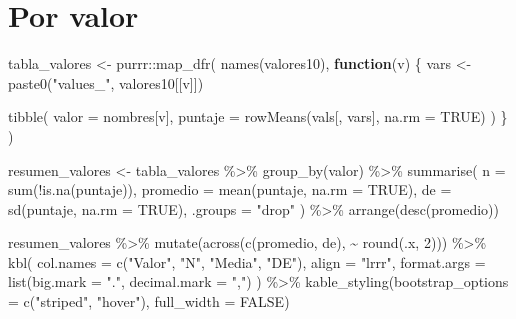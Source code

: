\documentclass[
  spanish,
  a4paper,
  oneside]{scrbook}
\newenvironment{Shaded}{\begin{snugshade}}{\end{snugshade}}
\newcommand{\AttributeTok}[1]{\textcolor[rgb]{0.40,0.45,0.13}{#1}}
\newcommand{\ConstantTok}[1]{\textcolor[rgb]{0.56,0.35,0.01}{#1}}
\newcommand{\ControlFlowTok}[1]{\textcolor[rgb]{0.00,0.23,0.31}{\textbf{#1}}}
\newcommand{\DecValTok}[1]{\textcolor[rgb]{0.68,0.00,0.00}{#1}}
\newcommand{\FunctionTok}[1]{\textcolor[rgb]{0.28,0.35,0.67}{#1}}
\newcommand{\NormalTok}[1]{\textcolor[rgb]{0.00,0.23,0.31}{#1}}
\newcommand{\OtherTok}[1]{\textcolor[rgb]{0.00,0.23,0.31}{#1}}
\newcommand{\SpecialCharTok}[1]{\textcolor[rgb]{0.37,0.37,0.37}{#1}}
\newcommand{\StringTok}[1]{\textcolor[rgb]{0.13,0.47,0.30}{#1}}
\begin{document}
\section{Por valor}\label{por-valor}

\begin{Shaded}
\begin{Highlighting}[]
\NormalTok{tabla\_valores }\OtherTok{\textless{}{-}}\NormalTok{ purrr}\SpecialCharTok{::}\FunctionTok{map\_dfr}\NormalTok{(}
  \FunctionTok{names}\NormalTok{(valores10),}
  \ControlFlowTok{function}\NormalTok{(v) \{}
\NormalTok{    vars }\OtherTok{\textless{}{-}} \FunctionTok{paste0}\NormalTok{(}\StringTok{"values\_"}\NormalTok{, valores10[[v]])}

    \FunctionTok{tibble}\NormalTok{(}
      \AttributeTok{valor =}\NormalTok{ nombres[v],}
      \AttributeTok{puntaje =} \FunctionTok{rowMeans}\NormalTok{(vals[, vars], }\AttributeTok{na.rm =} \ConstantTok{TRUE}\NormalTok{)}
\NormalTok{    )}
\NormalTok{  \}}
\NormalTok{)}

\NormalTok{resumen\_valores }\OtherTok{\textless{}{-}}\NormalTok{ tabla\_valores }\SpecialCharTok{\%\textgreater{}\%}
  \FunctionTok{group\_by}\NormalTok{(valor) }\SpecialCharTok{\%\textgreater{}\%}
  \FunctionTok{summarise}\NormalTok{(}
    \AttributeTok{n        =} \FunctionTok{sum}\NormalTok{(}\SpecialCharTok{!}\FunctionTok{is.na}\NormalTok{(puntaje)),}
    \AttributeTok{promedio =} \FunctionTok{mean}\NormalTok{(puntaje, }\AttributeTok{na.rm =} \ConstantTok{TRUE}\NormalTok{),}
    \AttributeTok{de       =} \FunctionTok{sd}\NormalTok{(puntaje, }\AttributeTok{na.rm =} \ConstantTok{TRUE}\NormalTok{),}
    \AttributeTok{.groups  =} \StringTok{"drop"}
\NormalTok{  ) }\SpecialCharTok{\%\textgreater{}\%}
  \FunctionTok{arrange}\NormalTok{(}\FunctionTok{desc}\NormalTok{(promedio))}

\NormalTok{resumen\_valores }\SpecialCharTok{\%\textgreater{}\%}
  \FunctionTok{mutate}\NormalTok{(}\FunctionTok{across}\NormalTok{(}\FunctionTok{c}\NormalTok{(promedio, de), }\SpecialCharTok{\textasciitilde{}} \FunctionTok{round}\NormalTok{(.x, }\DecValTok{2}\NormalTok{))) }\SpecialCharTok{\%\textgreater{}\%}
  \FunctionTok{kbl}\NormalTok{(}
    \AttributeTok{col.names =} \FunctionTok{c}\NormalTok{(}\StringTok{"Valor"}\NormalTok{, }\StringTok{"N"}\NormalTok{, }\StringTok{"Media"}\NormalTok{, }\StringTok{"DE"}\NormalTok{),}
    \AttributeTok{align =} \StringTok{"lrrr"}\NormalTok{,}
    \AttributeTok{format.args =} \FunctionTok{list}\NormalTok{(}\AttributeTok{big.mark =} \StringTok{"."}\NormalTok{, }\AttributeTok{decimal.mark =} \StringTok{","}\NormalTok{)}
\NormalTok{  ) }\SpecialCharTok{\%\textgreater{}\%}
  \FunctionTok{kable\_styling}\NormalTok{(}\AttributeTok{bootstrap\_options =} \FunctionTok{c}\NormalTok{(}\StringTok{"striped"}\NormalTok{, }\StringTok{"hover"}\NormalTok{), }\AttributeTok{full\_width =} \ConstantTok{FALSE}\NormalTok{)}
\end{Highlighting}
\end{Shaded}
\end{document}
